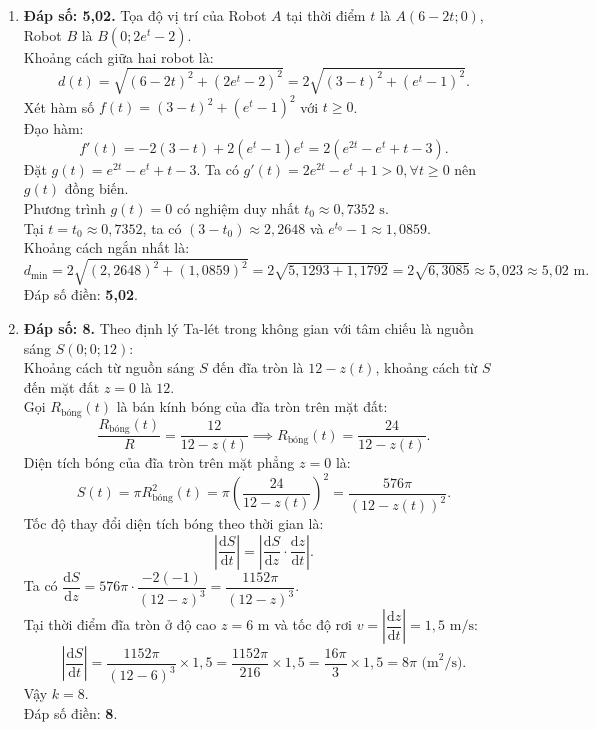 \documentclass[12pt,a4paper]{article}
\begin{document}
\begin{enumerate}[label=\textbf{Câu \arabic*:}, leftmargin=*]
\item \textbf{Đáp số: 5,02.}
Tọa độ vị trí của Robot $A$ tại thời điểm $t$ là $A(6 - 2t; 0)$, Robot $B$ là $B(0; 2e^t - 2)$.\\
Khoảng cách giữa hai robot là:
$$d(t) = \sqrt{(6 - 2t)^2 + (2e^t - 2)^2} = 2\sqrt{(3 - t)^2 + (e^t - 1)^2}.$$
Xét hàm số $f(t) = (3 - t)^2 + (e^t - 1)^2$ với $t \ge 0$.\\
Đạo hàm:
$$f'(t) = -2(3 - t) + 2(e^t - 1)e^t = 2\left( e^{2t} - e^t + t - 3 \right).$$
Đặt $g(t) = e^{2t} - e^t + t - 3$. Ta có $g'(t) = 2e^{2t} - e^t + 1 > 0, \forall t \ge 0$ nên $g(t)$ đồng biến.\\
Phương trình $g(t) = 0$ có nghiệm duy nhất $t_0 \approx 0{,}7352\text{ s}$.\\
Tại $t = t_0 \approx 0{,}7352$, ta có $(3 - t_0) \approx 2{,}2648$ và $e^{t_0} - 1 \approx 1{,}0859$.\\
Khoảng cách ngắn nhất là:
$$d_{\min} = 2\sqrt{(2{,}2648)^2 + (1{,}0859)^2} = 2\sqrt{5{,}1293 + 1{,}1792} = 2\sqrt{6{,}3085} \approx 5{,}023 \approx 5{,}02\text{ m}.$$
Đáp số điền: \textbf{5,02}.

\item \textbf{Đáp số: 8.}
Theo định lý Ta-lét trong không gian với tâm chiếu là nguồn sáng $S(0; 0; 12)$:\\
Khoảng cách từ nguồn sáng $S$ đến đĩa tròn là $12 - z(t)$, khoảng cách từ $S$ đến mặt đất $z = 0$ là $12$.\\
Gọi $R_{\text{bóng}}(t)$ là bán kính bóng của đĩa tròn trên mặt đất:
$$\dfrac{R_{\text{bóng}}(t)}{R} = \dfrac{12}{12 - z(t)} \implies R_{\text{bóng}}(t) = \dfrac{24}{12 - z(t)}.$$
Diện tích bóng của đĩa tròn trên mặt phẳng $z = 0$ là:
$$S(t) = \pi R_{\text{bóng}}^2(t) = \pi \left( \dfrac{24}{12 - z(t)} \right)^2 = \dfrac{576\pi}{(12 - z(t))^2}.$$
Tốc độ thay đổi diện tích bóng theo thời gian là:
$$\left| \dfrac{\mathrm{d}S}{\mathrm{d}t} \right| = \left| \dfrac{\mathrm{d}S}{\mathrm{d}z} \cdot \dfrac{\mathrm{d}z}{\mathrm{d}t} \right|.$$
Ta có $\dfrac{\mathrm{d}S}{\mathrm{d}z} = 576\pi \cdot \dfrac{-2(-1)}{(12 - z)^3} = \dfrac{1152\pi}{(12 - z)^3}$.\\
Tại thời điểm đĩa tròn ở độ cao $z = 6\text{ m}$ và tốc độ rơi $v = \left|\dfrac{\mathrm{d}z}{\mathrm{d}t}\right| = 1{,}5\text{ m/s}$:
$$\left| \dfrac{\mathrm{d}S}{\mathrm{d}t} \right| = \dfrac{1152\pi}{(12 - 6)^3} \times 1{,}5 = \dfrac{1152\pi}{216} \times 1{,}5 = \dfrac{16\pi}{3} \times 1{,}5 = 8\pi\text{ (m}^2/\text{s)}.$$
Vậy $k = 8$.\\
Đáp số điền: \textbf{8}.


\end{enumerate}
\end{document}
